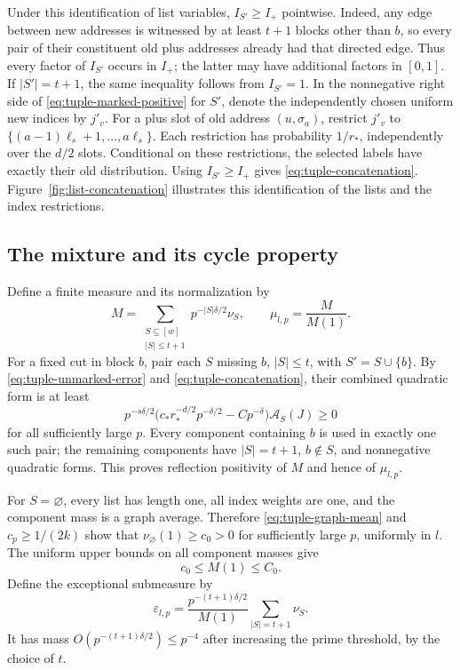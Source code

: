 Under this identification of list variables, $I_{S'}\ge I_+$ pointwise.
Indeed, any edge between new addresses is witnessed by at least $t+1$
blocks other than $b$, so every pair of their constituent old plus
addresses already had that directed edge.  Thus every factor of
$I_{S'}$ occurs in $I_+$; the latter may have additional factors in
$[0,1]$.  If $|S'|=t+1$, the same inequality follows from $I_{S'}=1$.
In the nonnegative right side of \eqref{eq:tuple-marked-positive} for
$S'$, denote the independently chosen uniform new indices by $j'_v$.
For a plus slot of old address $(u,\sigma_a)$, restrict $j'_v$ to
$\{(a-1)\ell_s+1,\ldots,a\ell_s\}$.  Each restriction has probability
$1/r_*$, independently over the $d/2$ slots.  Conditional on these
restrictions, the selected labels have exactly their old distribution.
Using $I_{S'}\ge I_+$ gives \eqref{eq:tuple-concatenation}.
Figure~\ref{fig:list-concatenation} illustrates this identification of
the lists and the index restrictions.



\subsection{The mixture and its cycle property}

Define a finite measure and its normalization by
\begin{equation}\label{eq:tuple-mixture}
 M=\sum_{\substack{S\subseteq[w]\\|S|\le t+1}}
           p^{-|S|\delta/2}\nu_S,
 \qquad \mu_{l,p}=\frac{M}{M(1)}.
\end{equation}
For a fixed cut in block $b$, pair each $S$ missing $b$, $|S|\le t$,
with $S'=S\cup\{b\}$.  By
\eqref{eq:tuple-unmarked-error} and \eqref{eq:tuple-concatenation}, their
combined quadratic form is at least
\[
 p^{-s\delta/2}
 \bigl(c_*r_*^{-d/2}p^{-\delta/2}-Cp^{-\delta}\bigr)
 \mathcal A_S(J)\ge0
\]
for all sufficiently large $p$.  Every component containing $b$ is
used in exactly one such pair; the remaining components have
$|S|=t+1$, $b\notin S$, and nonnegative quadratic forms.  This proves
reflection positivity of $M$ and hence of $\mu_{l,p}$.

For $S=\varnothing$, every list has length one, all index weights are
one, and the component mass is a graph average.  Therefore
\eqref{eq:tuple-graph-mean} and $c_p\ge1/(2k)$ show that
$\nu_\varnothing(1)\ge c_0>0$ for sufficiently large $p$, uniformly in
$l$.  The uniform upper bounds on all component masses give
\[
 c_0\le M(1)\le C_0.
\]
Define the exceptional submeasure by
\begin{equation}\label{eq:tuple-exceptional}
 \varepsilon_{l,p}
 =\frac{p^{-(t+1)\delta/2}}{M(1)}
       \sum_{|S|=t+1}\nu_S.
\end{equation}
It has mass $O(p^{-(t+1)\delta/2})\le p^{-4}$ after increasing the
prime threshold, by the choice of $t$.

